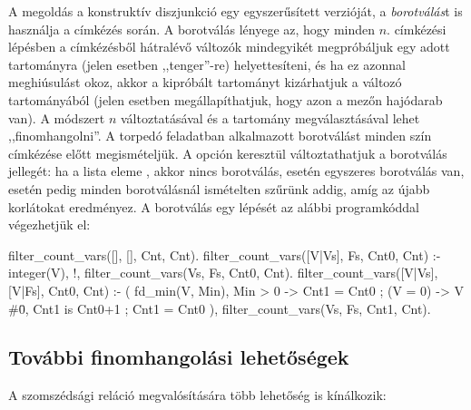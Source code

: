 A megoldás a konstruktív diszjunkció egy egyszerűsített verzióját, a \emph{borotválás}t
is használja a címkézés során. A borotválás lényege az, hogy minden $n$. címkézési
lépésben a címkézésből hátralévő változók mindegyikét megpróbáljuk egy adott
tartományra (jelen esetben ,,tenger''-re) helyettesíteni, és ha ez azonnal meghiúsulást
okoz, akkor a kipróbált tartományt kizárhatjuk a változó tartományából (jelen esetben
megállapíthatjuk, hogy azon a mezőn hajódarab van). A módszert $n$ változtatásával
és a tartomány megválasztásával lehet ,,finomhangolni''. A torpedó feladatban alkalmazott
borotválást minden szín címkézése előtt megismételjük. A 
opción keresztül változtathatjuk a borotválás jellegét: ha a lista eleme ,
akkor nincs borotválás,  esetén egyszeres borotválás van,  esetén
pedig minden borotválásnál ismételten szűrünk addig, amíg az újabb korlátokat eredményez.
\br
A borotválás egy lépését az alábbi programkóddal végezhetjük el:
\begin{prologcode}
filter_count_vars([], [], Cnt, Cnt).
filter_count_vars([V|Vs], Fs, Cnt0, Cnt) :-
        integer(V), !, filter_count_vars(Vs, Fs, Cnt0, Cnt).
filter_count_vars([V|Vs], [V|Fs], Cnt0, Cnt) :-
        (   fd_min(V, Min), Min > 0 -> Cnt1 = Cnt0
        ;   \+ (V = 0) -> V #\= 0, Cnt1 is Cnt0+1
        ;   Cnt1 = Cnt0
        ), filter_count_vars(Vs, Fs, Cnt1, Cnt).
\end{prologcode}

\subsection{További finomhangolási lehetőségek}

A szomszédsági reláció megvalósítására több lehetőség is kínálkozik:

